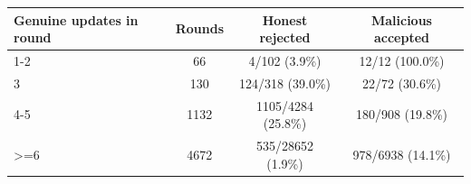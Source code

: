 \begin{tabular}{@{}lccc@{}}\toprule
Genuine updates in round & Rounds & Honest rejected & Malicious accepted\\\midrule
1-2 & 66 & 4/102 (3.9\%) & 12/12 (100.0\%) \\
3 & 130 & 124/318 (39.0\%) & 22/72 (30.6\%) \\
4-5 & 1132 & 1105/4284 (25.8\%) & 180/908 (19.8\%) \\
>=6 & 4672 & 535/28652 (1.9\%) & 978/6938 (14.1\%) \\
\bottomrule\end{tabular}
